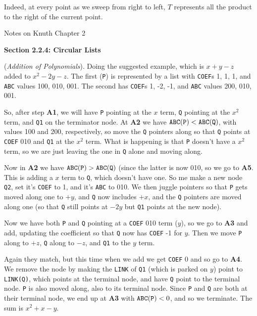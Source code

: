 Indeed, at every point as we sweep from right to left, $T$ represents all the
product to the right of the current point.

\vfil\break
\topglue 0.5in
\centerline{Notes on Knuth Chapter 2}
\vskip 0.3in

\noindent\centerline{{\bf Section 2.2.4: Circular Lists}}
\vskip 0.2in

 ({\it Addition of Polynomials}).  Doing the suggested example,
which is $x + y - z$ added to $x^2 - 2 y - z$.  The first ({\tt P}) is represented
by a list with {\tt COEF}s 1, 1, 1, and {\tt ABC} values 100, 010, 001.  The second
has {\tt COEF}s 1, -2, -1, and {\tt ABC} values 200, 010, 001.

So, after step {\bf A1}, we will have {\tt P} pointing at the $x$ term, {\tt Q} pointing
at the $x^2$ term, and {\tt Q1} on the terminator node.  At {\bf A2} we have
${\tt ABC(P)} < {\tt ABC(Q)}$, with values 100 and 200, respectively, so move the
{\tt Q} pointers along so that {\tt Q} points at {\tt COEF} 010 and {\tt Q1} at the
$x^2$ term.  What is happening is that {\tt P} doesn't have a $x^2$ term, so
we are just leaving the one in {\tt Q} alone and moving along.

  Now in {\bf A2} we have ${\tt ABC(P)} > {\tt ABC(Q)}$ (since
the latter is now 010, so we go to {\bf A5}.  This is adding a $x$ term to {\tt Q},
which doesn't have one.  So me make a new node {\tt Q2}, set it's {\tt COEF}
to 1, and it's {\tt ABC} to 010.  We then juggle pointers so that {\tt P} gets
moved along one to $+y$, and {\tt Q} now includes $+x$, and the {\tt Q}
pointers are moved along one (so that {\tt Q} still points at $-2y$ but {\tt Q1}
points at the new node).

Now we have both {\tt P} and {\tt Q} pointing at a {\tt COEF} 010 term ($y$),
so we go to {\bf A3} and add, updating the coefficient so that {\tt Q} now
has {\tt COEF} -1 for $y$.  Then we move {\tt P} along to $+z$, {\tt Q}
along to $-z$, and {\tt Q1} to the $y$ term.

Again they match, but this time when we add we get {\tt COEF} 0 and so go to
{\bf A4}.  We remove the node by making the {\tt LINK} of {\tt Q1} (which is
parked on $y$) point to {\tt LINK(Q)}, which points at the terminal node,
and have {\tt Q} point to the terminal node.  {\tt P} is also moved along, also
to its terminal node.  Since {\tt P} and {\tt Q} are both at their terminal node,
we end up at {\bf A3} with ${\tt ABC(P)} < 0$, and so we terminate.  
The sum is $x^2 + x - y$.

